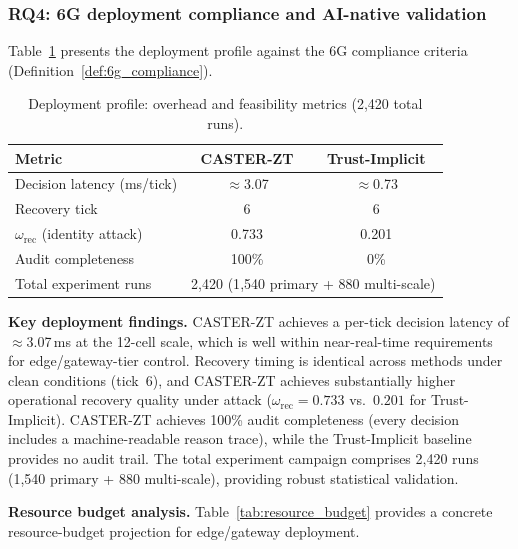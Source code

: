 \documentclass[10pt,journal,compsoc]{IEEEtran}
\begin{document}
\subsubsection{RQ4: 6G deployment compliance and AI-native validation}

Table~\ref{tab:deployment} presents the deployment profile against the 6G compliance criteria (Definition~\ref{def:6g_compliance}).

\begin{table}[t]
\centering
\caption{Deployment profile: overhead and feasibility metrics (2{,}420 total runs).}
\label{tab:deployment}
\begin{tabular}{lcc}
\toprule
Metric & CASTER-ZT & Trust-Implicit \\
\midrule
Decision latency (ms/tick) & $\approx$3.07 & $\approx$0.73 \\
Recovery tick            & 6     & 6     \\
$\omega_{\mathrm{rec}}$ (identity attack) & 0.733 & 0.201 \\
Audit completeness       & 100\% & 0\%   \\
Total experiment runs    & \multicolumn{2}{c}{2{,}420 (1{,}540 primary + 880 multi-scale)} \\
\bottomrule
\end{tabular}
\end{table}

\noindent\textbf{Key deployment findings.}
CASTER-ZT achieves a per-tick decision latency of $\approx$3.07\,ms at the 12-cell scale, which is well within near-real-time requirements for edge/gateway-tier control.
Recovery timing is identical across methods under clean conditions (tick~6), and CASTER-ZT achieves substantially higher operational recovery quality under attack ($\omega_{\mathrm{rec}} = 0.733$ vs.\ $0.201$ for Trust-Implicit).
CASTER-ZT achieves 100\% audit completeness (every decision includes a machine-readable reason trace), while the Trust-Implicit baseline provides no audit trail.
The total experiment campaign comprises 2,420 runs (1,540 primary + 880 multi-scale), providing robust statistical validation.

\noindent\textbf{Resource budget analysis.}
Table~\ref{tab:resource_budget} provides a concrete resource-budget projection for edge/gateway deployment.
\end{document}
